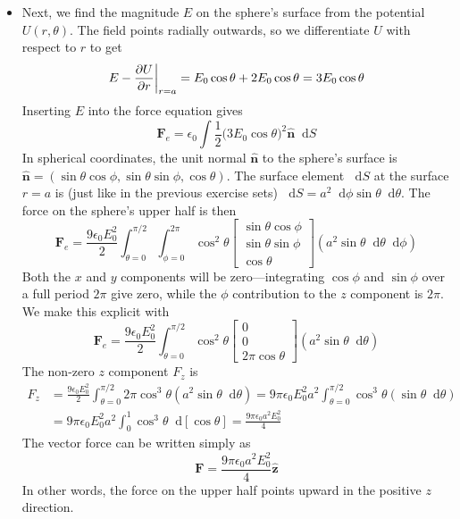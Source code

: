 \documentclass[11pt, a4paper]{article}
\newcommand{\diff}{\mathop{}\!\mathrm{d}} %
\renewcommand{\vec}[1]{\bm{#1}} %
\newcommand{\uvec}[1]{\hat{\vec{#1}}} %
\newcommand{\e}{\epsilon_{0}} %
\begin{document}
\begin{itemize}
	\item Next, we find the magnitude $ E $ on the sphere's surface from the potential $ U(r, \theta) $. The field points radially outwards, so we differentiate $ U $ with respect to $ r $ to get
	\begin{equation*}
		E - \pdv{U}{r} \bigg |_{r = a} = E_{0} \cos \theta + 2 E_{0} \cos \theta = 3E_{0} \cos \theta
	\end{equation*}
	Inserting $ E $ into the force equation gives
	\begin{equation*}
		\vec{F}_{e} = \e \int \frac{1}{2}\big(3E_{0} \cos \theta\big)^{2} \uvec{n} \diff S
	\end{equation*}
	In spherical coordinates, the unit normal $ \uvec{n} $ to the sphere's surface is $ \uvec{n} = (\sin \theta \cos \phi, \sin \theta \sin \phi, \cos \theta) $. The surface element $ \diff S $ at the surface $ r = a $ is (just like in the previous exercise sets) $ \diff S = a^{2} \diff \phi \sin \theta \diff \theta $. The force on the sphere's upper half is then
	\begin{equation*}
		\vec{F}_{e} = \frac{9\e E_{0}^{2}}{2} \int_{\theta = 0}^{\pi/2}\int_{\phi = 0}^{2\pi} \cos^{2} \theta 
		\begin{bmatrix}
			\sin \theta \cos \phi\\
			\sin \theta \sin \phi\\
			\cos \theta
		\end{bmatrix}
		(a^{2} \sin \theta \diff \theta \diff \phi) 
	\end{equation*}
	Both the $ x $ and $ y $ components will be zero---integrating $ \cos \phi $ and $ \sin \phi $ over a full period $ 2 \pi $ give zero, while the $ \phi $ contribution to the $ z $ component is $ 2\pi $.  We make this explicit with
	\begin{equation*}
		\vec{F}_{e} = \frac{9\e E_{0}^{2}}{2} \int_{\theta = 0}^{\pi/2}\cos^{2} \theta 
		\begin{bmatrix}
			0\\
			0\\
			2\pi \cos \theta 
		\end{bmatrix}
		(a^{2} \sin \theta \diff \theta) 
	\end{equation*}
	The non-zero $ z $ component $ F_{z} $ is 
	\begin{align*}
		F_{z} &= \frac{9\e E_{0}^{2}}{2} \int_{\theta = 0}^{\pi/2}2\pi \cos^{3} \theta (a^{2} \sin \theta \diff \theta) = 9\pi\e E_{0}^{2}a^{2} \int_{\theta = 0}^{\pi/2} \cos^{3} \theta (\sin \theta \diff \theta)\\
		& =  9\pi\e E_{0}^{2}a^{2} \int_{0}^{1} \cos^{3} \theta \diff [\cos \theta] = \frac{9\pi\e a^{2} E_{0}^{2}}{4}
	\end{align*}
	The vector force can be written simply as
	\begin{equation*}
		\vec{F} = \frac{9\pi\e a^{2} E_{0}^{2}}{4} \uvec{z}
	\end{equation*}
	In other words, the force on the upper half points upward in the positive $ z $ direction.	
	
\end{itemize}
\end{document}
